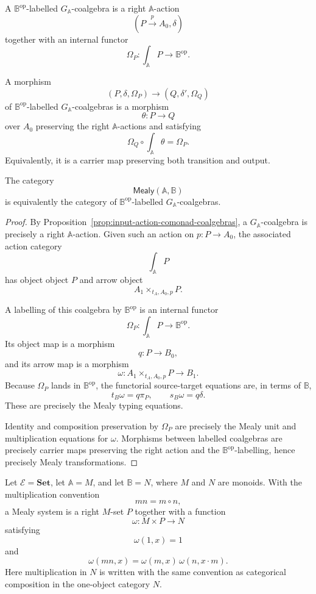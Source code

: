 \begin{definition}
\label{def:Bop-labelled-input-coalgebra}
A \(\mathbb B^{\mathrm{op}}\)-labelled \(G_{\mathbb A}\)-coalgebra is a
right \(\mathbb A\)-action
\[
(P\xrightarrow{p}A_0,\delta)
\]
together with an internal functor
\[
\Omega_P:\int_{\mathbb A}P\to\mathbb B^{\mathrm{op}}.
\]

A morphism
\[
(P,\delta,\Omega_P)\longrightarrow(Q,\delta',\Omega_Q)
\]
of \(\mathbb B^{\mathrm{op}}\)-labelled \(G_{\mathbb A}\)-coalgebras is a
morphism
\[
\theta:P\to Q
\]
over \(A_0\) preserving the right \(\mathbb A\)-actions and satisfying
\[
\Omega_Q\circ \int_{\mathbb A}\theta=\Omega_P.
\]
Equivalently, it is a carrier map preserving both transition and output.
\end{definition}

\begin{proposition}
\label{prop:mealy-labelled-input-coalgebras}
The category
\[
\mathsf{Mealy}(\mathbb A,\mathbb B)
\]
is equivalently the category of \(\mathbb B^{\mathrm{op}}\)-labelled
\(G_{\mathbb A}\)-coalgebras.
\end{proposition}

\begin{proof}
By Proposition~\ref{prop:input-action-comonad-coalgebras}, a
\(G_{\mathbb A}\)-coalgebra is precisely a right \(\mathbb A\)-action. Given
such an action on \(p:P\to A_0\), the associated action category
\[
\int_{\mathbb A}P
\]
has object object \(P\) and arrow object
\[
A_1\times_{t_A,A_0,p}P.
\]

A labelling of this coalgebra by \(\mathbb B^{\mathrm{op}}\) is an internal
functor
\[
\Omega_P:\int_{\mathbb A}P\to\mathbb B^{\mathrm{op}}.
\]
Its object map is a morphism
\[
q:P\to B_0,
\]
and its arrow map is a morphism
\[
\omega:A_1\times_{t_A,A_0,p}P\to B_1.
\]
Because \(\Omega_P\) lands in \(\mathbb B^{\mathrm{op}}\), the functorial
source-target equations are, in terms of \(\mathbb B\),
\[
t_B\omega=q\pi_P,
\qquad
s_B\omega=q\delta.
\]
These are precisely the Mealy typing equations.

Identity and composition preservation by \(\Omega_P\) are precisely the Mealy
unit and multiplication equations for \(\omega\). Morphisms between labelled
coalgebras are precisely carrier maps preserving the right action and the
\(\mathbb B^{\mathrm{op}}\)-labelling, hence precisely Mealy transformations.
\end{proof}

\begin{example}
\label{ex:one-object-labelled-coalgebras}
Let \(\mathcal E=\mathbf{Set}\), let \(\mathbb A=M\), and let
\(\mathbb B=N\), where \(M\) and \(N\) are monoids. With the multiplication
convention
\[
mn=m\circ n,
\]
a Mealy system is a right \(M\)-set \(P\) together with a function
\[
\omega:M\times P\to N
\]
satisfying
\[
\omega(1,x)=1
\]
and
\[
\omega(mn,x)=\omega(m,x)\,\omega(n,x\cdot m).
\]
Here multiplication in \(N\) is written with the same convention as
categorical composition in the one-object category \(N\).
\end{example}

